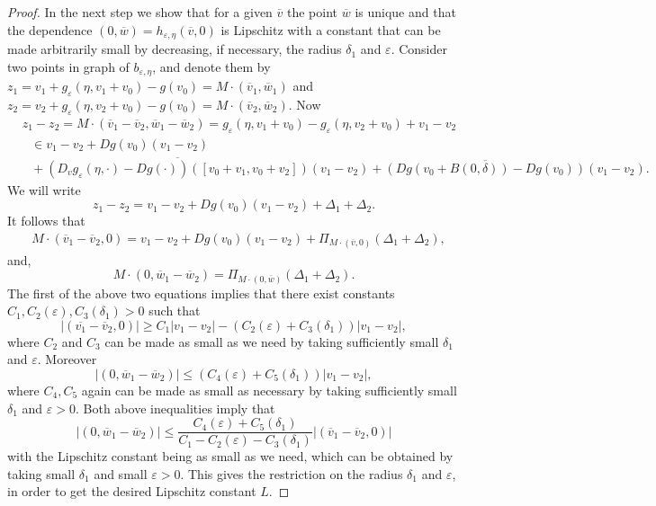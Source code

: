 \documentclass[11pt, leqno]{amsart}
\theoremstyle{definition}
\begin{document}
\begin{proof}
	 	In the next step we  show that for a given  $\overline{v}$ the point $\overline{w}$ is unique and that the dependence $(0,\overline{w}) = h_{\varepsilon,\eta}(\overline{v},0)$  is Lipschitz with a constant that can be made arbitrarily small by decreasing, if necessary, the radius ${\delta}_1$ and $\varepsilon$.   Consider two points in graph of $b_{\varepsilon,\eta}$, and denote them by $z_1=v_1+g_\varepsilon(\eta,v_1+v_0)-g(v_0)=M\cdot (\overline{v}_1,\overline{w}_1)$ and $z_2=v_2+g_\varepsilon(\eta,v_2+v_0)-g(v_0)=M\cdot (\overline{v}_2,\overline{w}_2)$.
	 	Now
	 	\begin{align*}		
	 	& z_1-z_2=M\cdot (\overline{v}_1-\overline{v}_2,\overline{w}_1-\overline{w}_2)  = g_\varepsilon(\eta,v_1+v_0)-g_\varepsilon(\eta,v_2+v_0)+v_1-v_2\\
	 	&\ \ \ \in v_1-v_2 + Dg(v_0)(v_1-v_2) \\
	 	& \ \ \ + \overline{\left(D_v g_\varepsilon(\eta,\cdot)-Dg(\cdot)\right)([v_0+v_1,v_0+v_2])}(v_1-v_2)
	 	+\overline{\left(Dg(v_0+B(0,\delta))-Dg(v_0)\right)}(v_1-v_2).
	 	\end{align*}
	 	We will write
	 	$$
	 	z_1-z_2 = v_1-v_2 + Dg(v_0)(v_1-v_2) + \Delta_1 + \Delta_2.
	 	$$
	 	It follows that
	 	\begin{align*}
	 		& M\cdot  (\overline{v}_1-\overline{v}_2,0) =  v_1-v_2 + Dg(v_0)(v_1-v_2)  + \Pi_{M\cdot  (\overline{v},0)}(\Delta_1+\Delta_2),
	 	\end{align*}
	 	and, 
	 	$$
	 	M\cdot  (0,\overline{w}_1-\overline{w}_2) =  \Pi_{M\cdot  (0,\overline{w})}(\Delta_1+\Delta_2).
	 	$$
	 	The first of the above two equations implies that there exist constants $C_1, C_2(\varepsilon), C_3(\delta_1) > 0$ such that
	 	$$
	 	|(\overline{v_1}-\overline{v}_2,0) | \geq C_1 |v_1-v_2| - (C_2(\varepsilon)+C_3(\delta_1))|v_1-v_2|,
	 	$$
	 	where $C_2$ and $C_3$ can be made as small as we need by taking sufficiently small $\delta_1$ and $\varepsilon$. Moreover
	 	$$
	 	| (0,\overline{w}_1-\overline{w}_2) | \leq (C_4(\varepsilon)+C_5(\delta_1)) |v_1-v_2|,
	 	$$
	 	where $C_4, C_5$ again can be made as small as necessary by taking sufficiently small $\delta_1$ and $\varepsilon>0$. Both above inequalities imply that 
	 	$$| (0,\overline{w}_1-\overline{w}_2) | \leq  \frac{C_4(\varepsilon)+C_5(\delta_1)}{C_1-C_2(\varepsilon)-C_3(\delta_1)}|(\overline{v}_1-\overline{v}_2,0) | $$
	 	 with the Lipschitz constant being as small as we need, which can be obtained by taking small $\delta_1$ and small $\varepsilon>0$. This gives the restriction on the radius $\delta_1$ and $\varepsilon$,  in order to get the desired Lipschitz constant $L$. \end{proof}
\end{document}

